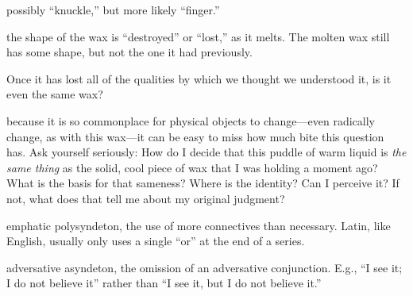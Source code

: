  possibly ``knuckle,'' but more likely ``finger.''

 the shape of the wax is ``destroyed'' or ``lost,'' as it melts. The molten wax still has some shape, but not the one it had previously.

 Once it has lost all of the qualities by which we thought we understood it, is it even the same wax?

 because it is so commonplace for physical objects to change---even radically change, as with this wax---it can be easy to miss how much bite this question has. Ask yourself seriously: How do I decide that this puddle of warm liquid is \textit{the same thing} as the solid, cool piece of wax that I was holding a moment ago? What is the basis for that sameness? Where is the identity? Can I perceive it? If not, what does that tell me about my original judgment?

 emphatic polysyndeton, the use of more connectives than necessary. Latin, like English, usually only uses a single ``or'' at the end of a series.

 adversative asyndeton, the omission of an adversative conjunction. E.g., ``I see it; I do not believe it'' rather than ``I see it, but I do not believe it.''

\clearpage


